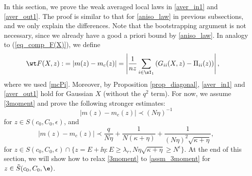 In this section, we prove the weak averaged local laws in \eqref{aver_in1} and \eqref{aver_out1}. %
The proof is similar to that for \eqref{aniso_law} in previous subsections, and we only explain the differences. Note that the bootstrapping argument is not necessary, since we already have a good a priori bound by \eqref{aniso_law}.
In analogy to (\ref{eq_comp_F(X)}), we define
\begin{align*}
\wt F(X,z) : &= |m(z)-m_{c}(z)| =\left|\frac{1}{nz}\sum_{i\in\sI_1} \left(G_{ii}(X,z)- \Pi_{ii}(z)\right)\right|,
\end{align*}
where we used \eqref{mcPi}. 
Moreover, by Proposition \ref{prop_diagonal}, \eqref{aver_in1} and \eqref{aver_out1} hold for Gaussian $X$ (without the $q^2$ term). For now, we assume \eqref{3moment} and prove the following stronger estimates:
\begin{equation}
 \vert m(z)-m_{c}(z) \vert \prec (N \eta)^{-1} \label{aver_ins} %
\end{equation}
for $z\in S(c_0,C_0,\epsilon)$, and 
\begin{equation}\label{aver_outs}
 | m(z)-m_{c}(z)|\prec \frac{q}{N\eta}  + \frac{1}{N(\kappa +\eta)} + \frac{1}{(N\eta)^2\sqrt{\kappa +\eta}},
\end{equation}
for $z\in S(c_0,C_0,\epsilon)\cap \{z=E+\ii\eta: E\ge \lambda_r, N\eta\sqrt{\kappa + \eta} \ge N^\epsilon\}$. At the end of this section, we will show how to relax \eqref{3moment} to \eqref{assm_3moment} for $z\in \tilde S(c_0,C_0,\e)$.

